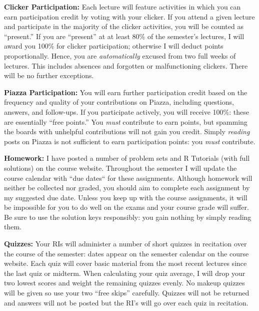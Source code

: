 \documentclass[11pt, letterpaper]{article}
\begin{document}
\medskip


\noindent \textbf{Clicker Participation:} 
Each lecture will feature activities in which you can earn participation credit by voting with your clicker. 
If you attend a given lecture and participate in the majority of the clicker activities, you will be counted as ``present.'' 
If you are ``present'' at at least 80\% of the semester's lectures, I will award you 100\% for clicker participation; otherwise I will deduct points proportionally. 
Hence, you are \emph{automatically} excused from two full weeks of lectures. 
This includes absences and forgotten or malfunctioning clickers. There will be no further exceptions.


\medskip

\noindent \textbf{Piazza Participation:} 
You will earn further participation credit based on the frequency and quality of your contributions on Piazza, including questions, answers, and follow-ups. 
If you participate actively, you will receive 100\%: these are essentially ``free points.''  
You \emph{must} contribute to earn points, but spamming the boards with unhelpful contributions will not gain you credit.  
Simply \emph{reading} posts on Piazza is not sufficient to earn participation points: you \emph{must} contribute.

\medskip



\noindent \textbf{Homework:} 
I have posted a number of problem sets and R Tutorials (with full solutions) on the course website.
Throughout the semester I will update the course calendar with ``due dates`` for these assignments.
Although homework will neither be collected nor graded, you should aim to complete each assignment by my suggested due date.
Unless you keep up with the course assignments, it will be impossible for you to do well on the exams and your course grade will suffer.
Be sure to use the solution keys responsibly: you gain nothing by simply reading them.


\medskip

\noindent \textbf{Quizzes:} 
Your RIs will administer a number of short quizzes in recitation over the course of the semester: dates appear on the semester calendar on the course website.
Each quiz will cover basic material from the most recent lectures since the last quiz or midterm. 
When calculating your quiz average, I will drop your two lowest scores and weight the remaining quizzes evenly. 
No makeup quizzes will be given so use your two ``free skips'' carefully.
Quizzes will not be returned and answers will not be posted but the RI's will go over each quiz in recitation.
\end{document}
